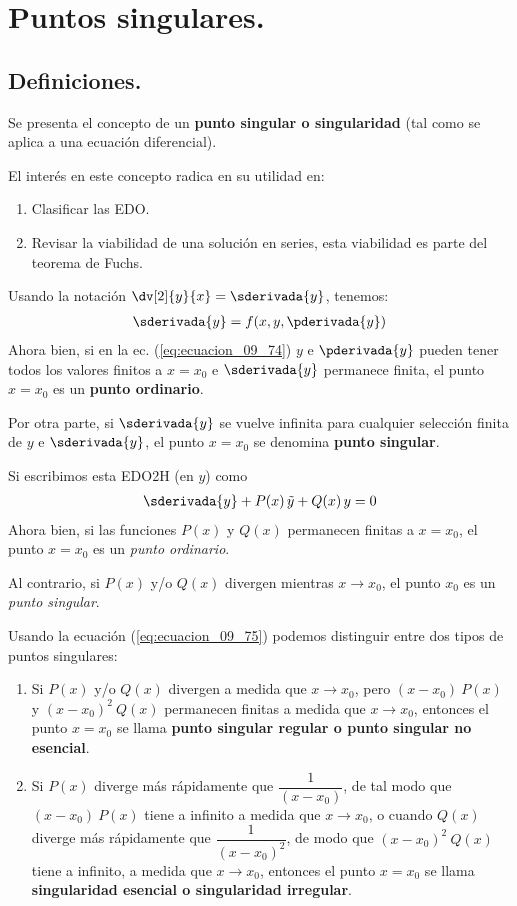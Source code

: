 \section{Puntos singulares.}
\subsection{Definiciones.}

Se presenta el concepto de un \textbf{punto singular o singularidad} (tal como se aplica a una ecuación diferencial).
\par
El interés en este concepto radica en su utilidad en:
\begin{enumerate}
\item Clasificar las EDO.
\item Revisar la viabilidad de una solución en series, esta viabilidad es parte del teorema de Fuchs.
\end{enumerate}
Usando la notación $\displaystyle \dv[2]{y}{x} = \sderivada{y}$, tenemos:
\begin{align}
\sderivada{y} = f (x, y, \pderivada{y})
\label{eq:ecuacion_09_74}
\end{align}
Ahora bien, si en la ec. (\ref{eq:ecuacion_09_74}) $y$ e $\pderivada{y}$ pueden tener todos los valores finitos a $x = x_{0}$ e $\sderivada{y}$ permanece finita, el punto $x = x_{0}$ es un \textbf{punto ordinario}.
\par
Por otra parte, si $\sderivada{y}$ se vuelve infinita para cualquier selección finita de $y$ e  $\sderivada{y}$, el punto $x = x_{0}$ se denomina \textbf{punto singular}.
\par
Si escribimos esta EDO2H (en $y$) como
\begin{align}
\sderivada{y} + P (x) \, \tilde{y} + Q(x) \, y = 0
\label{eq:ecuacion_09_75}
\end{align}
Ahora bien, si las funciones $P (x)$ y $Q (x)$ permanecen finitas a $x = x_{0}$, el punto $x = x_{0}$ es un \emph{punto ordinario}.
\par
Al contrario, si $P (x)$ y/o $Q (x)$ divergen mientras $x \to x_{0}$, el punto $x_{0}$ es un \emph{punto singular}.
\par
Usando la ecuación (\ref{eq:ecuacion_09_75}) podemos distinguir entre dos tipos de puntos singulares:
\begin{enumerate}
\item Si $P (x)$ y/o $ Q(x)$ divergen a medida que $x \to x_{0}$, pero $(x - x_{0}) \: P (x)$ y $(x - x_{0})^{2} \: Q (x)$ permanecen finitas a medida que $x \to x_{0}$, entonces el punto $x = x_{0}$ se llama \textbf{punto singular regular o punto singular no esencial}.
\item Si $P (x)$ diverge más rápidamente que $\dfrac{1}{(x - x_{0})}$, de tal modo que $(x - x_{0}) \: P (x)$ tiene a infinito a medida que $x \to x_{0}$, o cuando $Q (x)$ diverge más rápidamente que $\dfrac{1}{(x - x_{0})^{2}}$, de modo que $(x - x_{0})^{2} \: Q (x)$ tiene a infinito, a medida que $x \to x_{0}$, entonces el punto $x = x_{0}$ se llama \textbf{singularidad esencial o singularidad irregular}.
\end{enumerate}
